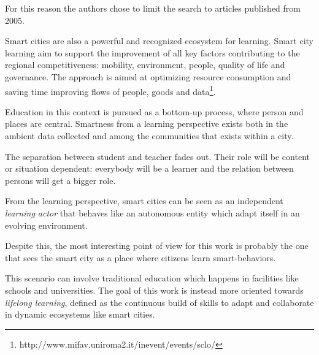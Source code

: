 For this reason the authors chose to limit the search to articles published from 2005.

Smart cities are also a powerful and recognized ecosystem for learning. Smart city learning aim to support the improvement of all key factors contributing to the regional competitiveness: mobility, environment, people, quality of life and governance. The approach is aimed at optimizing resource consumption and saving time improving flows of people, goods and data\footnote{http://www.mifav.uniroma2.it/inevent/events/sclo/}.

Education in this context is pursued as a bottom-up process, where person and places are central. Smartness from a learning perspective exists both in the ambient data collected and among the communities that exists within a city.

The separation between student and teacher fades out. Their role will be content or situation dependent: everybody will be a learner and the relation between persons will get a bigger role.

From the learning perspective, smart cities can be seen as an independent \textit{learning actor} that behaves like an autonomous entity which adapt itself in an evolving environment.

Despite this, the most interesting point of view for this work is probably the one that sees the smart city as a place where citizens learn smart-behaviors.

This scenario can involve traditional education which happens in facilities like schools and universities. The goal of this work is instead more oriented towards \textit{lifelong learning}, defined as the continuous build of skills to adapt and collaborate in dynamic ecosystems like smart cities.